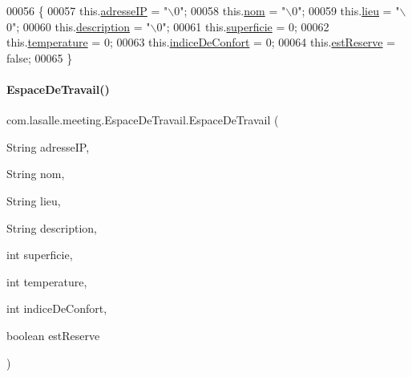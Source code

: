 \begin{DoxyCode}
00056     \{
00057         this.\hyperlink{classcom_1_1lasalle_1_1meeting_1_1_espace_de_travail_aa4d9547d0170feeeb49c123e36226b79}{adresseIP} = \textcolor{stringliteral}{"\(\backslash\)0"};
00058         this.\hyperlink{classcom_1_1lasalle_1_1meeting_1_1_espace_de_travail_a9c06de6de73757cbec902e14055969ce}{nom} = \textcolor{stringliteral}{"\(\backslash\)0"};
00059         this.\hyperlink{classcom_1_1lasalle_1_1meeting_1_1_espace_de_travail_a375f1e6b0d3590706d863f6dbd86dd11}{lieu} = \textcolor{stringliteral}{"\(\backslash\)0"};
00060         this.\hyperlink{classcom_1_1lasalle_1_1meeting_1_1_espace_de_travail_a4633baf86d38c201c7e288fda3604bd7}{description} = \textcolor{stringliteral}{"\(\backslash\)0"};
00061         this.\hyperlink{classcom_1_1lasalle_1_1meeting_1_1_espace_de_travail_a3a5b9c42fa29930b092154e1bd0e4c10}{superficie} = 0;
00062         this.\hyperlink{classcom_1_1lasalle_1_1meeting_1_1_espace_de_travail_ad5349fa46af27855755ce6cee644a6e2}{temperature} = 0;
00063         this.\hyperlink{classcom_1_1lasalle_1_1meeting_1_1_espace_de_travail_a6a75c9c45ccb98895e02a1864bf4a41d}{indiceDeConfort} = 0;
00064         this.\hyperlink{classcom_1_1lasalle_1_1meeting_1_1_espace_de_travail_a8913c30ae6b72ae4f35962b1ecfc496b}{estReserve} = \textcolor{keyword}{false};
00065     \}
\end{DoxyCode}
\mbox{\label{classcom_1_1lasalle_1_1meeting_1_1_espace_de_travail_aa1f0c767a1b77048cfad17bbd49e9fe5}} 
\paragraph{\texorpdfstring{Espace\+De\+Travail()}{EspaceDeTravail()}\hspace{0.1cm}{\footnotesize\ttfamily [2/2]}}
{\footnotesize\ttfamily com.\+lasalle.\+meeting.\+Espace\+De\+Travail.\+Espace\+De\+Travail (\begin{DoxyParamCaption}\item[{String}]{adresse\+IP,  }\item[{String}]{nom,  }\item[{String}]{lieu,  }\item[{String}]{description,  }\item[{int}]{superficie,  }\item[{int}]{temperature,  }\item[{int}]{indice\+De\+Confort,  }\item[{boolean}]{est\+Reserve }\end{DoxyParamCaption})}



